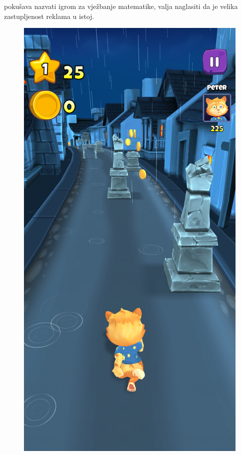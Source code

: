 \documentclass[times, utf8, zavrsni]{fer}
\begin{document}
	 pokušava nazvati igrom za vježbanje matematike, valja naglasiti da je velika zastupljenost reklama u istoj. \begin{figure}[!htb]
		\begin{minipage}{0.48\textwidth}
			\centering
			\includegraphics[scale=0.15]{"slike/igre/toonmath1.png"} 

\end{minipage}
\end{figure}
\end{document}
